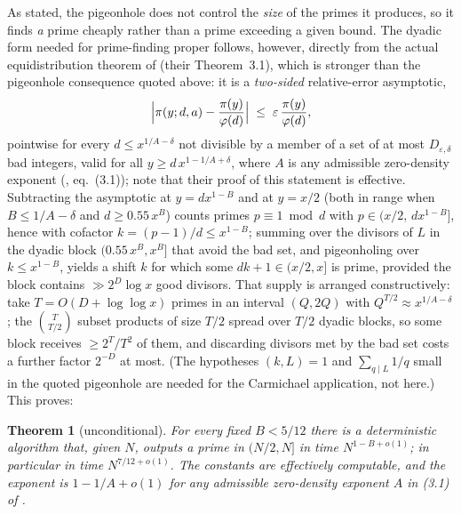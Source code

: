 \documentclass[11pt]{amsart}
\newtheorem{theorem}{Theorem}[section]
\begin{document}
As stated, the pigeonhole does not control the \emph{size} of the primes it
produces, so it finds \emph{a} prime cheaply rather than a prime exceeding a
given bound. The dyadic form needed for prime-finding proper follows,
however, directly from the actual equidistribution theorem of \cite{AGP}
(their Theorem~3.1), which is stronger than the pigeonhole consequence
quoted above: it is a \emph{two-sided} relative-error asymptotic,
\[
\Bigl| \pi(y; d, a) - \frac{\pi(y)}{\varphi(d)} \Bigr|
\;\le\; \varepsilon\, \frac{\pi(y)}{\varphi(d)},
\]
pointwise for every $d \le x^{1/A - \delta}$ not divisible by a member of a
set of at most $D_{\varepsilon,\delta}$ bad integers, valid for all
$y \ge d\, x^{1 - 1/A + \delta}$, where $A$ is any admissible zero-density
exponent (\cite{AGP}, eq.~(3.1)); \cite{AGP} note that their proof of this
statement is effective. Subtracting the asymptotic at $y = d x^{1-B}$ and at
$y = x/2$ (both in range when $B \le 1/A - \delta$ and
$d \ge 0.55\, x^{B}$) counts primes $p \equiv 1 \bmod d$ with
$p \in (x/2,\, dx^{1-B}]$, hence with cofactor $k = (p-1)/d \le x^{1-B}$;
summing over the divisors of $L$ in the dyadic block $(0.55\,x^B, x^B]$ that
avoid the bad set, and pigeonholing over $k \le x^{1-B}$, yields a shift $k$
for which some $dk + 1 \in (x/2, x]$ is prime, provided the block contains
$\gg 2^{D} \log x$ good divisors. That supply is arranged constructively:
take $T = O(D + \log\log x)$ primes in an interval $(Q, 2Q)$ with
$Q^{T/2} \approx x^{1/A - \delta}$; the $\binom{T}{T/2}$ subset products of
size $T/2$ spread over $T/2$ dyadic blocks, so some block receives
$\ge 2^{T}/T^2$ of them, and discarding divisors met by the bad set costs a
further factor $2^{-D}$ at most. (The hypotheses $(k, L) = 1$ and
$\sum_{q \mid L} 1/q$ small in the quoted pigeonhole are needed for the
Carmichael application, not here.) This proves:

\begin{theorem}[unconditional]
\label{prop:agpset}
For every fixed $B < 5/12$ there is a deterministic algorithm that, given
$N$, outputs a prime in $(N/2, N]$ in time $N^{1-B+o(1)}$; in particular in
time $N^{7/12 + o(1)}$. The constants are effectively computable, and the
exponent is $1 - 1/A + o(1)$ for any admissible zero-density exponent $A$ in
\textup{(3.1)} of \cite{AGP}.
\end{theorem}
\end{document}
